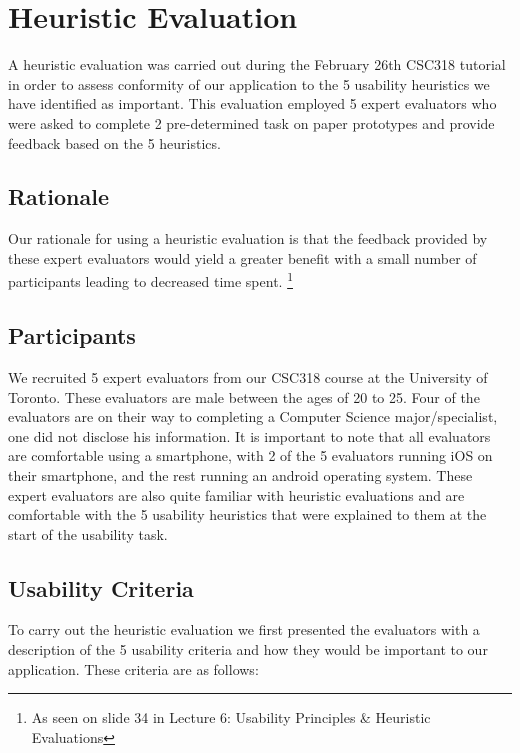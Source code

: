 \documentclass[pdftex,12pt,a4paper]{report}
\begin{document}

\tableofcontents

\chapter{Heuristic Evaluation}
A heuristic evaluation was carried out during the February 26th CSC318 tutorial in order to assess conformity of our application to the 5 usability heuristics we have identified as important. This evaluation employed 5 expert evaluators who were asked to complete 2 pre-determined task on paper prototypes and provide feedback based on the 5 heuristics.

\section{Rationale}
Our rationale for using a heuristic evaluation is that the feedback provided by these expert evaluators would yield a greater benefit with a small number of participants leading to decreased time spent. \footnote{As seen on slide 34 in Lecture 6: Usability Principles \& Heuristic Evaluations}

\section{Participants}
We recruited 5 expert evaluators from our CSC318 course at the University of Toronto. These evaluators are male between the ages of 20 to 25. Four of the evaluators are on their way to completing a Computer Science major/specialist, one did not disclose his information. It is important to note that all evaluators are comfortable using a smartphone, with 2 of the 5 evaluators running iOS on their smartphone, and the rest running an android operating system. These expert evaluators are also quite familiar with heuristic evaluations and are comfortable with the 5 usability heuristics that were explained to them at the start of the usability task.
\section{Usability Criteria}

To carry out the heuristic evaluation we first presented the evaluators with a description of the 5 usability criteria and how they would be important to our application. These criteria are as follows:
\vspace{12pt}
\end{document}
